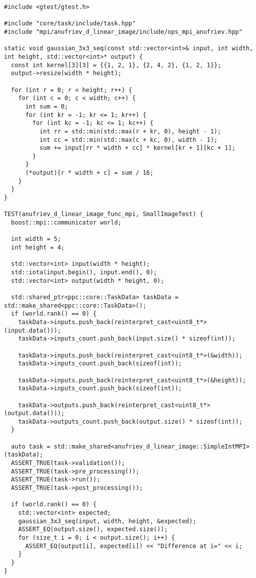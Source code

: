 \documentclass[12pt]{article}
\begin{document}
\begin{lstlisting}
#include <gtest/gtest.h>

#include "core/task/include/task.hpp"
#include "mpi/anufriev_d_linear_image/include/ops_mpi_anufriev.hpp"

static void gaussian_3x3_seq(const std::vector<int>& input, int width, int height, std::vector<int>* output) {
  const int kernel[3][3] = {{1, 2, 1}, {2, 4, 2}, {1, 2, 1}};
  output->resize(width * height);

  for (int r = 0; r < height; r++) {
    for (int c = 0; c < width; c++) {
      int sum = 0;
      for (int kr = -1; kr <= 1; kr++) {
        for (int kc = -1; kc <= 1; kc++) {
          int rr = std::min(std::max(r + kr, 0), height - 1);
          int cc = std::min(std::max(c + kc, 0), width - 1);
          sum += input[rr * width + cc] * kernel[kr + 1][kc + 1];
        }
      }
      (*output)[r * width + c] = sum / 16;
    }
  }
}

TEST(anufriev_d_linear_image_func_mpi, SmallImageTest) {
  boost::mpi::communicator world;

  int width = 5;
  int height = 4;

  std::vector<int> input(width * height);
  std::iota(input.begin(), input.end(), 0);
  std::vector<int> output(width * height, 0);

  std::shared_ptr<ppc::core::TaskData> taskData = std::make_shared<ppc::core::TaskData>();
  if (world.rank() == 0) {
    taskData->inputs.push_back(reinterpret_cast<uint8_t*>(input.data()));
    taskData->inputs_count.push_back(input.size() * sizeof(int));

    taskData->inputs.push_back(reinterpret_cast<uint8_t*>(&width));
    taskData->inputs_count.push_back(sizeof(int));

    taskData->inputs.push_back(reinterpret_cast<uint8_t*>(&height));
    taskData->inputs_count.push_back(sizeof(int));

    taskData->outputs.push_back(reinterpret_cast<uint8_t*>(output.data()));
    taskData->outputs_count.push_back(output.size() * sizeof(int));
  }

  auto task = std::make_shared<anufriev_d_linear_image::SimpleIntMPI>(taskData);
  ASSERT_TRUE(task->validation());
  ASSERT_TRUE(task->pre_processing());
  ASSERT_TRUE(task->run());
  ASSERT_TRUE(task->post_processing());

  if (world.rank() == 0) {
    std::vector<int> expected;
    gaussian_3x3_seq(input, width, height, &expected);
    ASSERT_EQ(output.size(), expected.size());
    for (size_t i = 0; i < output.size(); i++) {
      ASSERT_EQ(output[i], expected[i]) << "Difference at i=" << i;
    }
  }
}


\end{lstlisting}
\end{document}

